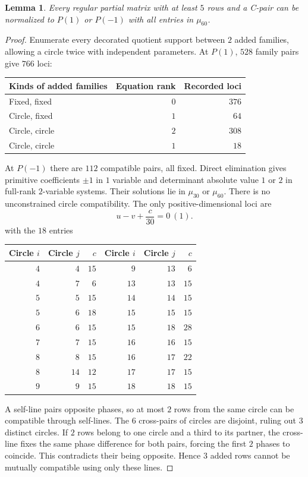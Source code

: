 \documentclass[11pt,a4paper]{article}
\newtheorem{lemma}[theorem]{Lemma}
\theoremstyle{plain}
\theoremstyle{definition}
\numberwithin{equation}{section}
\begin{document}
\begin{lemma}\label{lem:Cmu60}
Every regular partial matrix with at least $5$ rows and a C-pair can be normalized to $P(1)$ or $P(-1)$ with all entries in $\mu_{60}$.
\end{lemma}
\begin{proof}
Enumerate every decorated quotient support between $2$ added families, allowing a circle twice with independent parameters. At $P(1)$, $528$ family pairs give $766$ loci:
\begin{center}\begin{tabular}{lrr}\toprule
Kinds of added families&Equation rank&Recorded loci\\\midrule
Fixed, fixed&$0$&$376$\\
Circle, fixed&$1$&$64$\\
Circle, circle&$2$&$308$\\
Circle, circle&$1$&$18$\\\bottomrule
\end{tabular}\end{center}
At $P(-1)$ there are $112$ compatible pairs, all fixed. Direct elimination gives primitive coefficients $\pm1$ in $1$ variable and determinant absolute value $1$ or $2$ in full-rank $2$-variable systems. Their solutions lie in $\mu_{30}$ or $\mu_{60}$. There is no unconstrained circle compatibility. The only positive-dimensional loci are
\begin{equation}\label{eq:Cfreeline}
u-v+\frac{c}{30}=0\ (1).
\end{equation}
with the $18$ entries
\begin{center}\small \begin{tabular}{rrr@{\qquad}rrr}\toprule
Circle $i$&Circle $j$&$c$&Circle $i$&Circle $j$&$c$\\\midrule
$4$&$4$&$15$&$9$&$13$&$6$\\
$4$&$7$&$6$&$13$&$13$&$15$\\
$5$&$5$&$15$&$14$&$14$&$15$\\
$5$&$6$&$18$&$15$&$15$&$15$\\
$6$&$6$&$15$&$15$&$18$&$28$\\
$7$&$7$&$15$&$16$&$16$&$15$\\
$8$&$8$&$15$&$16$&$17$&$22$\\
$8$&$14$&$12$&$17$&$17$&$15$\\
$9$&$9$&$15$&$18$&$18$&$15$\\
\bottomrule\end{tabular}\end{center}
A self-line pairs opposite phases, so at most $2$ rows from the same circle can be compatible through self-lines. The $6$ cross-pairs of circles are disjoint, ruling out $3$ distinct circles. If $2$ rows belong to one circle and a third to its partner, the cross-line fixes the same phase difference for both pairs, forcing the first $2$ phases to coincide. This contradicts their being opposite. Hence $3$ added rows cannot be mutually compatible using only these lines.


\end{proof}
\end{document}

